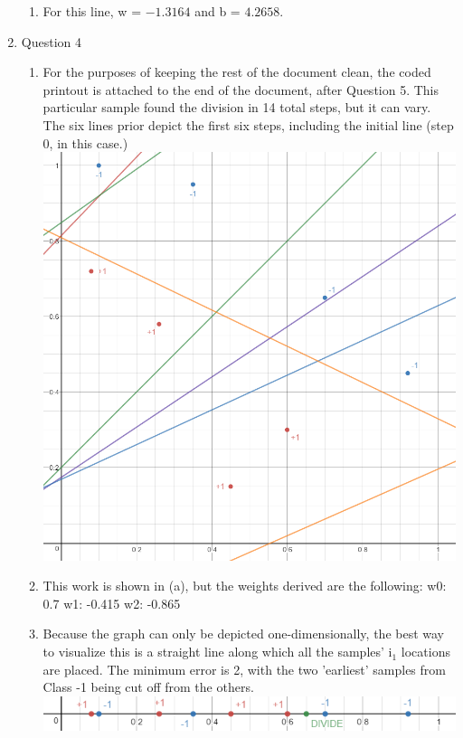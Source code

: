 \documentclass[11pt]{article}
\begin{document}
\begin{enumerate}
\begin {enumerate}
\item For this line, w = ${-1.3164}$ and b = ${\text{4.2658}}$.
\end {enumerate}
\item Question 4
\begin {enumerate}
\item
For the purposes of keeping the rest of the document clean, the coded printout is attached to the end of the document, after Question 5. This particular sample found the division in 14 total steps, but it can vary. \newline
The six lines prior depict the first six steps, including the initial line (step 0, in this case.) \newline
\includegraphics[scale=0.4]{graph1}
\item
This work is shown in (a), but the weights derived are the following: \newline
w0: 0.7 w1: -0.415 w2: -0.865
\item
Because the graph can only be depicted one-dimensionally, the best way to visualize this is a straight line along which all the samples' i$_{\text{1}}$ locations are placed. The minimum error is 2, with the two 'earliest' samples from Class -1 being cut off from the others. \newline
\includegraphics[scale=0.75]{graph2}

\end{enumerate}
\end{enumerate}
\end{document}
